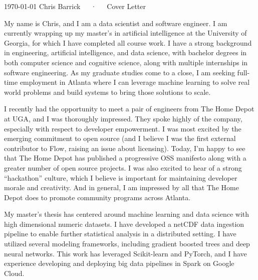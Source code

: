 \documentclass[11pt, letterpaper]{awesome-cv}
\begin{document}
\makecvheader[C]

\makecvfooter
  {\today}
  {Chris Barrick~~~·~~~Cover Letter}
  {\thepage}

\makelettertitle

\begin{cvletter}

My name is Chris, and I am a data scientist and software engineer. I am currently wrapping up my master's in artificial intelligence at the University of Georgia, for which I have completed all course work. I have a strong background in engineering, artificial intelligence, and data science, with bachelor degrees in both computer science and cognitive science, along with multiple internships in software engineering. As my graduate studies come to a close, I am seeking full-time employment in Atlanta where I can leverage machine learning to solve real world problems and build systems to bring those solutions to scale.

I recently had the opportunity to meet a pair of engineers from The Home Depot at UGA, and I was thoroughly impressed. They spoke highly of the company, especially with respect to developer empowerment. I was most excited by the emerging commitment to open source (and I believe I was the first external contributor to Flow, raising an issue about licensing). Today, I'm happy to see that The Home Depot has published a progressive OSS manifesto along with a greater number of open source projects. I was also excited to hear of a strong ``hackathon'' culture, which I believe is important for maintaining developer morale and creativity. And in general, I am impressed by all that The Home Depot does to promote community programs across Atlanta.

My master's thesis has centered around machine learning and data science with high dimensional numeric datasets. I have developed a netCDF data ingestion pipeline to enable further statistical analysis in a distributed setting. I have utilized several modeling frameworks, including gradient boosted trees and deep neural networks. This work has leveraged Scikit-learn and PyTorch, and I have experience developing and deploying big data pipelines in Spark on Google Cloud.


\end{cvletter}
\end{document}
